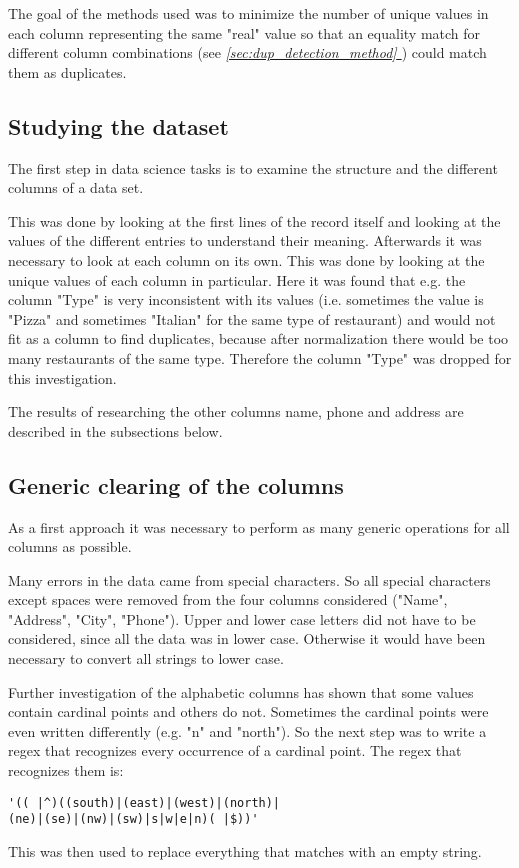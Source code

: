 \documentclass[conference]{IEEEtran}
\newcommand*{\fullref}[1]{\textit{\hyperref[{#1}]{\autoref*{#1} \nameref*{#1}}}}
\begin{document}
The goal of the methods used was to minimize the number of unique values in each column representing the same "real" value so that an equality match for different column combinations (see \fullref{sec:dup_detection_method}) could match them as duplicates.
\subsection{Studying the dataset}
The first step in data science tasks is to examine the structure and the different columns of a data set. 

This was done by looking at the first lines of the record itself and looking at the values of the different entries to understand their meaning. Afterwards it was necessary to look at each column on its own. This was done by looking at the unique values of each column in particular. Here it was found that e.g. the column "Type" is very inconsistent with its values (i.e. sometimes the value is "Pizza" and sometimes "Italian" for the same type of restaurant) and would not fit as a column to find duplicates, because after normalization there would be too many restaurants of the same type. Therefore the column "Type" was dropped for this investigation.

The results of researching the other columns name, phone and address are described in the subsections below.
\subsection{Generic clearing of the columns}
As a first approach it was necessary to perform as many generic operations for all columns as possible. 

Many errors in the data came from special characters. So all special characters except spaces were removed from the four columns considered ("Name", "Address", "City", "Phone"). Upper and lower case letters did not have to be considered, since all the data was in lower case. Otherwise it would have been necessary to convert all strings to lower case.

Further investigation of the alphabetic columns has shown that some values contain cardinal points and others do not. Sometimes the cardinal points were even written differently (e.g. "n" and "north"). So the next step was to write a regex that recognizes every occurrence of a cardinal point. The regex that recognizes them is: 
\begin{lstlisting}
'(( |^)((south)|(east)|(west)|(north)|
(ne)|(se)|(nw)|(sw)|s|w|e|n)( |$))'
\end{lstlisting}
This was then used to replace everything that matches with an empty string.
\end{document}
